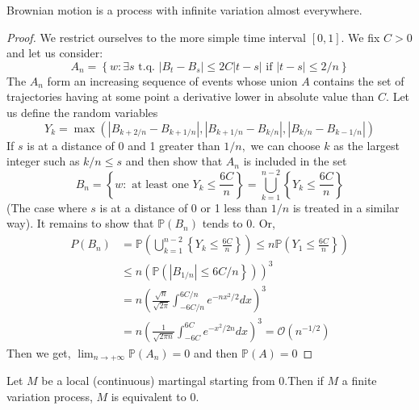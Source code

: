 \begin{proposition}
Brownian motion is a process with infinite variation almost everywhere.
\end{proposition}
\begin{proof}
	We restrict ourselves to the more simple time interval $[0,1]$.
	We fix $C>0$ and let us consider:
	$$
	A_{n}=\left\{w: \exists s \text { t.q. }\left|B_{t}-B_{s}\right| \leq 2 C|t-s| \text { if }|t-s| \leq 2 / n\right\}
	$$
	The $A_ {n}$ form an increasing sequence of events whose union $A$ contains the set of trajectories having at some point a derivative lower in absolute value than $ C. $ Let us define the random variables
	$$
	Y_{k}=\max \left(\left|B_{k+2 / n}-B_{k+1 / n}\right|,\left|B_{k+1 / n}-B_{k / n}\right|,\left|B_{k / n}-B_{k-1 / n}\right|\right)
	$$
If $s$ is at a distance of 0 and 1 greater than $1/n,$ we can choose $k$ as the largest integer such as $k/n \leq s $ and then show that $A_{n}$ is included in the set
	$$
	B_{n}=\left\{w: \text { at least one } Y_{k} \leq \frac{6 C}{n}\right\}=\bigcup_{k=1}^{n-2}\left\{Y_{k} \leq \frac{6 C}{n}\right\}
	$$
	(The case where $ s $ is at a distance of 0 or 1 less than $1/n$ is treated in a similar way).
	It remains to show that $\mathbb{P} \left(B_{n} \right) $ tends to $0.$ Or,
	$$
	\begin{aligned}
	P\left(B_{n}\right) &\left.=\mathbb{P}\left(\bigcup_{k=1}^{n-2}\left\{Y_{k} \leq \frac{6 C}{n}\right\}\right) \leq n \mathbb{P}\left(Y_{1} \leq \frac{6 C}{n}\right\}\right) \\
	&\left.\leq n\left(\mathbb{P}\left(\left|B_{1 / n}\right| \leq 6 C / n\right\}\right)\right)^{3} \\
	&=n\left(\frac{\sqrt{n}}{\sqrt{2 \pi}} \int_{-6 C / n}^{6 C / n} e^{-n x^{2} / 2} d x\right)^{3} \\
	&=n\left(\frac{1}{\sqrt{2 \pi n}} \int_{-6 C}^{6 C} e^{-x^{2} / 2 n} d x\right)^{3}=\mathcal{O}\left(n^{-1 / 2}\right)
	\end{aligned}
	$$
	Then we get, $\lim _{n \rightarrow+\infty} \mathbb{P}\left(A_{n}\right)=0$ and then $\mathbb{P}(A)=0$
\end{proof}

\begin{theorem} \label{thm:finit_var_martingale}
		Let $M$ be a local (continuous) martingal starting from $0$.Then if $M$ a finite variation process, $M$ is equivalent to $0.$
\end{theorem}

